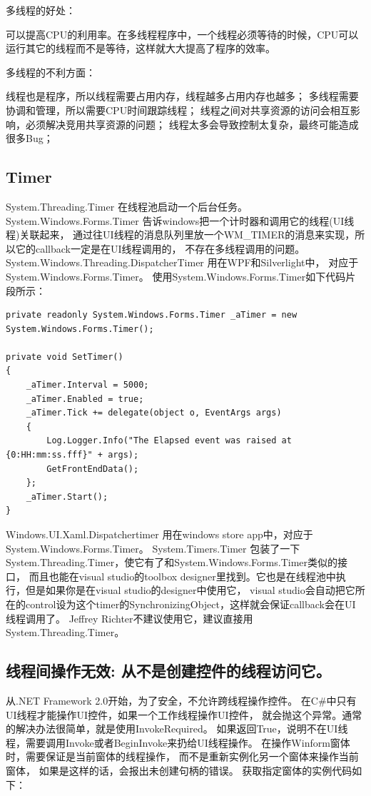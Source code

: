 \documentclass{book}
\begin{document}
多线程的好处：

可以提高CPU的利用率。在多线程程序中，一个线程必须等待的时候，CPU可以运行其它的线程而不是等待，这样就大大提高了程序的效率。

多线程的不利方面：

线程也是程序，所以线程需要占用内存，线程越多占用内存也越多；
多线程需要协调和管理，所以需要CPU时间跟踪线程；
线程之间对共享资源的访问会相互影响，必须解决竞用共享资源的问题；
线程太多会导致控制太复杂，最终可能造成很多Bug；

\subsection{Timer}

System.Threading.Timer  在线程池启动一个后台任务。
System.Windows.Forms.Timer  告诉windows把一个计时器和调用它的线程(UI线程)关联起来，
通过往UI线程的消息队列里放一个WM\_TIMER的消息来实现，所以它的callback一定是在UI线程调用的，
不存在多线程调用的问题。
System.Windows.Threading.DispatcherTimer 用在WPF和Silverlight中，
对应于System.Windows.Forms.Timer。
使用System.Windows.Forms.Timer如下代码片段所示：

\begin{lstlisting}[language={[Sharp]C}]
private readonly System.Windows.Forms.Timer _aTimer = new System.Windows.Forms.Timer();

private void SetTimer()
{
	_aTimer.Interval = 5000;
	_aTimer.Enabled = true;
	_aTimer.Tick += delegate(object o, EventArgs args)
	{
		Log.Logger.Info("The Elapsed event was raised at {0:HH:mm:ss.fff}" + args);
		GetFrontEndData();
	};
	_aTimer.Start();
}
\end{lstlisting}

Windows.UI.Xaml.Dispatchertimer 用在windows store app中，对应于System.Windows.Forms.Timer。
System.Timers.Timer 包装了一下System.Threading.Timer，使它有了和System.Windows.Forms.Timer类似的接口，
而且也能在visual studio的toolbox designer里找到。它也是在线程池中执行，但是如果你是在visual studio的designer中使用它，
visual studio会自动把它所在的control设为这个timer的SynchronizingObject，这样就会保证callback会在UI线程调用了。
Jeffrey Richter不建议使用它，建议直接用System.Threading.Timer。

\subsection{线程间操作无效: 从不是创建控件的线程访问它。}

从.NET Framework 2.0开始，为了安全，不允许跨线程操作控件。
在C\#中只有UI线程才能操作UI控件，如果一个工作线程操作UI控件，
就会抛这个异常。通常的解决办法很简单，就是使用InvokeRequired。
如果返回True，说明不在UI线程，需要调用Invoke或者BeginInvoke来扔给UI线程操作。
在操作Winform窗体时，需要保证是当前窗体的线程操作，
而不是重新实例化另一个窗体来操作当前窗体，
如果是这样的话，会报出未创建句柄的错误。
获取指定窗体的实例代码如下：
\end{document}
